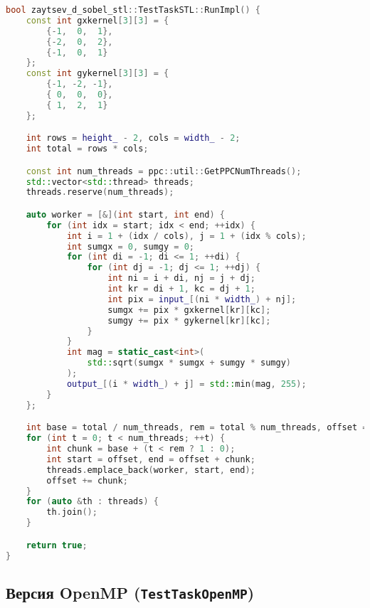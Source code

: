 \documentclass[12pt]{article}
\begin{document}
\begin{lstlisting}[language=C++, caption={Параллельная реализация с использованием std::thread}]
bool zaytsev_d_sobel_stl::TestTaskSTL::RunImpl() {
    const int gxkernel[3][3] = {
        {-1,  0,  1},
        {-2,  0,  2},
        {-1,  0,  1}
    };
    const int gykernel[3][3] = {
        {-1, -2, -1},
        { 0,  0,  0},
        { 1,  2,  1}
    };

    int rows = height_ - 2, cols = width_ - 2;
    int total = rows * cols;

    const int num_threads = ppc::util::GetPPCNumThreads();
    std::vector<std::thread> threads;
    threads.reserve(num_threads);

    auto worker = [&](int start, int end) {
        for (int idx = start; idx < end; ++idx) {
            int i = 1 + (idx / cols), j = 1 + (idx % cols);
            int sumgx = 0, sumgy = 0;
            for (int di = -1; di <= 1; ++di) {
                for (int dj = -1; dj <= 1; ++dj) {
                    int ni = i + di, nj = j + dj;
                    int kr = di + 1, kc = dj + 1;
                    int pix = input_[(ni * width_) + nj];
                    sumgx += pix * gxkernel[kr][kc];
                    sumgy += pix * gykernel[kr][kc];
                }
            }
            int mag = static_cast<int>(
                std::sqrt(sumgx * sumgx + sumgy * sumgy)
            );
            output_[(i * width_) + j] = std::min(mag, 255);
        }
    };

    int base = total / num_threads, rem = total % num_threads, offset = 0;
    for (int t = 0; t < num_threads; ++t) {
        int chunk = base + (t < rem ? 1 : 0);
        int start = offset, end = offset + chunk;
        threads.emplace_back(worker, start, end);
        offset += chunk;
    }
    for (auto &th : threads) {
        th.join();
    }

    return true;
}
\end{lstlisting}

\subsection{Версия OpenMP (\texttt{TestTaskOpenMP})}
\end{document}
